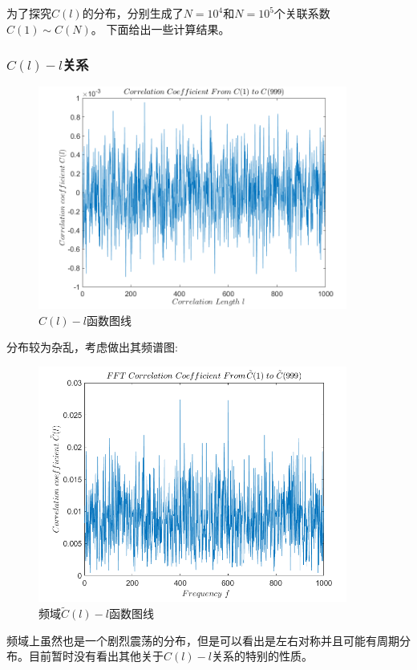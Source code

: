 \documentclass[UTF8]{ctexart}
\begin{document}
\begin{flushleft}
		为了探究$C(l)$的分布，分别生成了$N=10^4$和$N=10^5$个关联系数$C(1)\sim C(N)$。
	下面给出一些计算结果。
	\subsubsection{$C(l)-l$关系}
\end{flushleft}
	
		\begin{figure}[H]
			\centering\includegraphics[width=4in]{../figure/cor.png}
			\caption{$C(l)-l$函数图线}
		\end{figure}
	分布较为杂乱，考虑做出其频谱图:
		\begin{figure}[H]
			\centering\includegraphics[width=4in]{../figure/fft.png}
			\caption{频域$\tilde{C}(l)-l$函数图线}
		\end{figure}
	\begin{flushleft}
		频域上虽然也是一个剧烈震荡的分布，但是可以看出是左右对称并且可能有周期分布。目前暂时没有看出其他关于$C(l)-l$关系的特别的性质。
	\end{flushleft}
	
\end{document}
